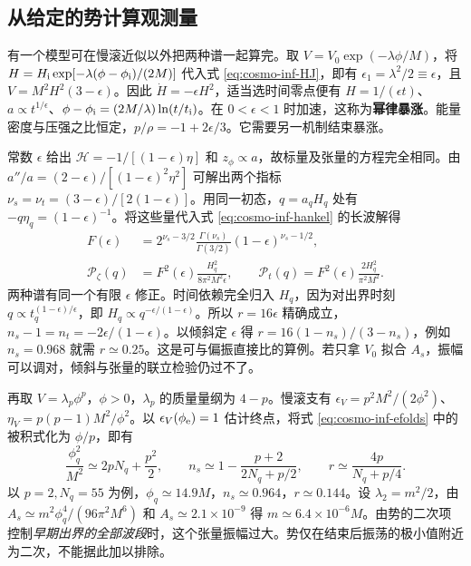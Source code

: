 \subsection{从给定的势计算观测量}\label{sec:cosmo-inf-models}

有一个模型可在慢滚近似以外把两种谱一起算完。取 $V=V_0\exp(-\lambda\phi/M)$，将 $H=H_{\rm i}\exp[-\lambda(\phi-\phi_{\rm i})/(2M)]$ 代入式 \eqref{eq:cosmo-inf-HJ}，即有 $\epsilon_1=\lambda^2/2\equiv\epsilon$，且 $V=M^2H^2(3-\epsilon)$。因此 $\dot H=-\epsilon H^2$，适当选时间零点便有 $H=1/(\epsilon t)$、$a\propto t^{1/\epsilon}$、$\phi-\phi_{\rm i}=(2M/\lambda)\ln(t/t_{\rm i})$。在 $0<\epsilon<1$ 时加速，这称为\textbf{幂律暴涨}。能量密度与压强之比恒定，$p/\rho=-1+2\epsilon/3$。它需要另一机制结束暴涨。

常数 $\epsilon$ 给出 $\mathcal H=-1/[(1-\epsilon)\eta]$ 和 $z_\phi\propto a$，故标量及张量的方程完全相同。由 $a''/a=(2-\epsilon)/[(1-\epsilon)^2\eta^2]$ 可解出两个指标 $\nu_s=\nu_t=(3-\epsilon)/[2(1-\epsilon)]$。用同一初态，$q=a_qH_q$ 处有 $-q\eta_q=(1-\epsilon)^{-1}$。将这些量代入式 \eqref{eq:cosmo-inf-hankel} 的长波解得
\begin{align}
 F(\epsilon)&=2^{\nu_s-3/2}\frac{\Gamma(\nu_s)}{\Gamma(3/2)}
                 (1-\epsilon)^{\nu_s-1/2},\nonumber\\
 \mathcal P_\zeta(q)&=F^2(\epsilon)\frac{H_q^2}{8\pi^2M^2\epsilon},
 \qquad \mathcal P_t(q)=F^2(\epsilon)\frac{2H_q^2}{\pi^2M^2}.
 \label{eq:cosmo-inf-powerlaw}
\end{align}
两种谱有同一个有限 $\epsilon$ 修正。时间依赖完全归入 $H_q$，因为对出界时刻 $q\propto t_q^{(1-\epsilon)/\epsilon}$，即 $H_q\propto q^{-\epsilon/(1-\epsilon)}$。所以 $r=16\epsilon$ 精确成立，$n_s-1=n_t=-2\epsilon/(1-\epsilon)$。以倾斜定 $\epsilon$ 得 $r=16(1-n_s)/(3-n_s)$，例如 $n_s=0.968$ 就需 $r\simeq0.25$。这是可与偏振直接比的算例。若只拿 $V_0$ 拟合 $A_s$，振幅可以调对，倾斜与张量的联立检验仍过不了。

再取 $V=\lambda_p\phi^p$，$\phi>0$，$\lambda_p$ 的质量量纲为 $4-p$。慢滚支有 $\epsilon_V=p^2M^2/(2\phi^2)$、$\eta_V=p(p-1)M^2/\phi^2$。以 $\epsilon_V(\phi_{\rm e})=1$ 估计终点，将式 \eqref{eq:cosmo-inf-efolds} 中的被积式化为 $\phi/p$，即有
\[
 \frac{\phi_q^2}{M^2}\simeq2pN_q+\frac{p^2}{2},\qquad
 n_s\simeq1-\frac{p+2}{2N_q+p/2},\qquad
 r\simeq\frac{4p}{N_q+p/4}.
\]
以 $p=2,N_q=55$ 为例，$\phi_q\simeq14.9M$，$n_s\simeq0.964$，$r\simeq0.144$。设 $\lambda_2=m^2/2$，由 $A_s\simeq m^2\phi_q^4/(96\pi^2M^6)$ 和 $A_s\simeq2.1\times10^{-9}$ 得 $m\simeq6.4\times10^{-6}M$。由势的二次项控制\emph{早期出界的全部波段}时，这个张量振幅过大。势仅在结束后振荡的极小值附近为二次，不能据此加以排除。


